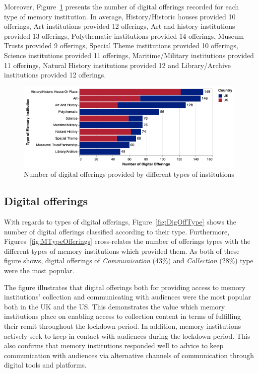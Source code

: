 \documentclass{egpubl}
\begin{document}
Moreover, Figure~\ref{fig:typeofferings} presents the number of digital offerings recorded for each type of memory institution. In average, History/Historic houses provided 10 offerings, Art institutions provided 12 offerings, Art and history institutions provided 13 offerings, Polythematic institutions provided 14 offerings, Museum Trusts provided 9 offerings, Special Theme institutions provided 10 offerings, Science institutions provided 11 offerings, Maritime/Military institutions provided 11 offerings, Natural History institutions provided 12 and Library/Archive institutions provided 12 offerings. 

\begin{figure}[h]
  \centering
  \includegraphics[width=\linewidth]{images/typesoffering.png}
  \caption{\label{fig:typeofferings}
           Number of digital offerings provided by different types of institutions}
\end{figure}




\subsection{Digital offerings}
With regards to types of digital offerings, Figure~\ref{fig:DigOffType} shows the number of digital offerings classified according to their type. Furthermore, Figures~\ref{fig:MTypeOfferings} cross-relates the number of offerings types with the different types of memory institutions which provided them. As both of these figure shows, digital offerings of \emph{Communication} (43\%) and \emph{Collection} (28\%) type were the most popular. 

The figure illustrates that digital offerings both for providing access to memory institutions' collection and communicating with audiences were the most popular both in the UK and the US. This demonstrates the value which memory institutions place on enabling access to collection content in terms of fulfilling their remit throughout the lockdown period. In addition, memory institutions actively seek to keep in contact with audiences during the lockdown period. This also confirms that memory institutions responded well to advice to keep communication with audiences via alternative channels of communication through digital tools and platforms. 
\end{document}
